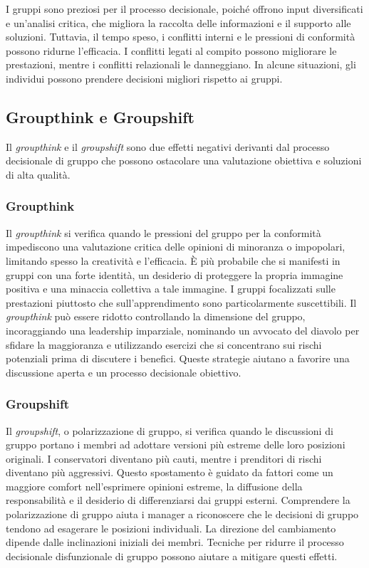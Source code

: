 \documentclass{article}
\begin{document}
I gruppi sono preziosi per il processo decisionale, poiché offrono input diversificati e un'analisi critica, che migliora la raccolta delle informazioni e il supporto alle soluzioni. Tuttavia, il tempo speso, i conflitti interni e le pressioni di conformità possono ridurne l'efficacia. I conflitti legati al compito possono migliorare le prestazioni, mentre i conflitti relazionali le danneggiano. In alcune situazioni, gli individui possono prendere decisioni migliori rispetto ai gruppi.

\subsection{Groupthink e Groupshift}
Il \textit{groupthink} e il \textit{groupshift} sono due effetti negativi derivanti dal processo decisionale di gruppo che possono ostacolare una valutazione obiettiva e soluzioni di alta qualità.

\subsubsection{Groupthink}
Il \textit{groupthink} si verifica quando le pressioni del gruppo per la conformità impediscono una valutazione critica delle opinioni di minoranza o impopolari, limitando spesso la creatività e l'efficacia. È più probabile che si manifesti in gruppi con una forte identità, un desiderio di proteggere la propria immagine positiva e una minaccia collettiva a tale immagine. I gruppi focalizzati sulle prestazioni piuttosto che sull'apprendimento sono particolarmente suscettibili. Il \textit{groupthink} può essere ridotto controllando la dimensione del gruppo, incoraggiando una leadership imparziale, nominando un avvocato del diavolo per sfidare la maggioranza e utilizzando esercizi che si concentrano sui rischi potenziali prima di discutere i benefici. Queste strategie aiutano a favorire una discussione aperta e un processo decisionale obiettivo.

\subsubsection{Groupshift}
Il \textit{groupshift}, o polarizzazione di gruppo, si verifica quando le discussioni di gruppo portano i membri ad adottare versioni più estreme delle loro posizioni originali. I conservatori diventano più cauti, mentre i prenditori di rischi diventano più aggressivi. Questo spostamento è guidato da fattori come un maggiore comfort nell'esprimere opinioni estreme, la diffusione della responsabilità e il desiderio di differenziarsi dai gruppi esterni. Comprendere la polarizzazione di gruppo aiuta i manager a riconoscere che le decisioni di gruppo tendono ad esagerare le posizioni individuali. La direzione del cambiamento dipende dalle inclinazioni iniziali dei membri. Tecniche per ridurre il processo decisionale disfunzionale di gruppo possono aiutare a mitigare questi effetti.
\end{document}
